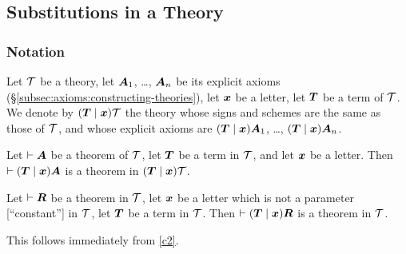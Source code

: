 \subsection{Substitutions in a Theory}

\subsubsection{Notation}
Let $\mathcal{T}$ be a theory, let $\boldsymbol{A}_{1}$, \dots,
$\boldsymbol{A}_{n}$ be its explicit axioms (\S\ref{subsec:axioms:constructing-theories}),
let $\boldsymbol{x}$ be a letter, let $\boldsymbol{T}$ be a term of
$\mathcal{T}$. We denote by
$(\boldsymbol{T}\mid\boldsymbol{x})\mathcal{T}$ the theory whose
signs and schemes are the same as those of $\mathcal{T}$, and whose
explicit axioms are
$(\boldsymbol{T}\mid\boldsymbol{x})\boldsymbol{A}_{1}$, \dots,
$(\boldsymbol{T}\mid\boldsymbol{x})\boldsymbol{A}_{n}$.

\begin{dc}\label{c2}
Let $\vdash\boldsymbol{A}$ be a theorem of $\mathcal{T}$,
let $\boldsymbol{T}$ be a term in $\mathcal{T}$,
and let $\boldsymbol{x}$ be a letter. Then $\vdash(\boldsymbol{T}\mid\boldsymbol{x})\boldsymbol{A}$
is a theorem in $(\boldsymbol{T}\mid\boldsymbol{x})\mathcal{T}$.
\end{dc}

\begin{dc}\label{c3}
Let $\vdash\boldsymbol{R}$ be a theorem in $\mathcal{T}$, let
$\boldsymbol{x}$ be a letter which is not a parameter [``constant'']
in $\mathcal{T}$, let $\boldsymbol{T}$ be a term in $\mathcal{T}$.
Then $\vdash(\boldsymbol{T}\mid\boldsymbol{x})\boldsymbol{R}$ is a
theorem in $\mathcal{T}$.
\end{dc}

This follows immediately from \ref{c2}.
